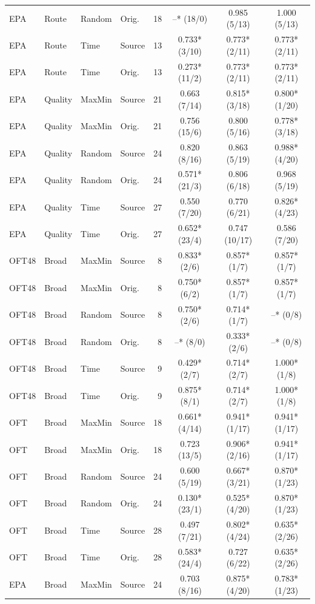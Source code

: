 \begin{longtable}{llllrccc}
EPA & Route & Random & Orig. & 18 & --* (18/0) & 0.985 (5/13) & 1.000 (5/13) \\
EPA & Route & Time & Source & 13 & 0.733* (3/10) & 0.773* (2/11) & 0.773* (2/11) \\
EPA & Route & Time & Orig. & 13 & 0.273* (11/2) & 0.773* (2/11) & 0.773* (2/11) \\
EPA & Quality & MaxMin & Source & 21 & 0.663 (7/14) & 0.815* (3/18) & 0.800* (1/20) \\
EPA & Quality & MaxMin & Orig. & 21 & 0.756 (15/6) & 0.800 (5/16) & 0.778* (3/18) \\
EPA & Quality & Random & Source & 24 & 0.820 (8/16) & 0.863 (5/19) & 0.988* (4/20) \\
EPA & Quality & Random & Orig. & 24 & 0.571* (21/3) & 0.806 (6/18) & 0.968 (5/19) \\
EPA & Quality & Time & Source & 27 & 0.550 (7/20) & 0.770 (6/21) & 0.826* (4/23) \\
EPA & Quality & Time & Orig. & 27 & 0.652* (23/4) & 0.747 (10/17) & 0.586 (7/20) \\
OFT48 & Broad & MaxMin & Source & 8 & 0.833* (2/6) & 0.857* (1/7) & 0.857* (1/7) \\
OFT48 & Broad & MaxMin & Orig. & 8 & 0.750* (6/2) & 0.857* (1/7) & 0.857* (1/7) \\
OFT48 & Broad & Random & Source & 8 & 0.750* (2/6) & 0.714* (1/7) & --* (0/8) \\
OFT48 & Broad & Random & Orig. & 8 & --* (8/0) & 0.333* (2/6) & --* (0/8) \\
OFT48 & Broad & Time & Source & 9 & 0.429* (2/7) & 0.714* (2/7) & 1.000* (1/8) \\
OFT48 & Broad & Time & Orig. & 9 & 0.875* (8/1) & 0.714* (2/7) & 1.000* (1/8) \\
OFT & Broad & MaxMin & Source & 18 & 0.661* (4/14) & 0.941* (1/17) & 0.941* (1/17) \\
OFT & Broad & MaxMin & Orig. & 18 & 0.723 (13/5) & 0.906* (2/16) & 0.941* (1/17) \\
OFT & Broad & Random & Source & 24 & 0.600 (5/19) & 0.667* (3/21) & 0.870* (1/23) \\
OFT & Broad & Random & Orig. & 24 & 0.130* (23/1) & 0.525* (4/20) & 0.870* (1/23) \\
OFT & Broad & Time & Source & 28 & 0.497 (7/21) & 0.802* (4/24) & 0.635* (2/26) \\
OFT & Broad & Time & Orig. & 28 & 0.583* (24/4) & 0.727 (6/22) & 0.635* (2/26) \\
EPA & Broad & MaxMin & Source & 24 & 0.703 (8/16) & 0.875* (4/20) & 0.783* (1/23) \\

\end{longtable}
